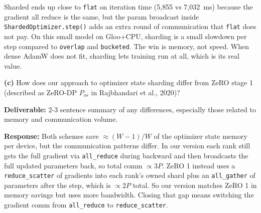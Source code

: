 \documentclass[11pt]{article}
\begin{document}
\noindent Sharded ends up close to \texttt{flat} on iteration time (5{,}855 vs 7{,}032~ms) because the gradient all reduce is the same, but the param broadcast inside \texttt{ShardedOptimizer.step()} adds an extra round of communication that \texttt{flat} does not pay. On this small model on Gloo+CPU, sharding is a small slowdown per step compared to \texttt{overlap} and \texttt{bucketed}. The win is memory, not speed. When dense AdamW does not fit, sharding lets training run at all, which is its real value.

\vspace{0.25cm}
\textbf{(c)} How does our approach to optimizer state sharding differ from ZeRO stage 1 (described as ZeRO-DP $P_{os}$ in Rajbhandari et al., 2020)?

\textbf{Deliverable:} 2-3 sentence summary of any differences, especially those related to memory and communication volume.

\vspace{0.25cm}
\textbf{Response:}
Both schemes save $\approx (W-1)/W$ of the optimizer state memory per device, but the communication patterns differ. In our version each rank still gets the full gradient via \texttt{all\_reduce} during backward and then broadcasts the full updated parameters back, so total comm $\propto 3P$. ZeRO 1 instead uses a \texttt{reduce\_scatter} of gradients into each rank's owned shard plus an \texttt{all\_gather} of parameters after the step, which is $\propto 2P$ total. So our version matches ZeRO 1 in memory savings but uses more bandwidth. Closing that gap means switching the gradient comm from \texttt{all\_reduce} to \texttt{reduce\_scatter}.
\end{document}

